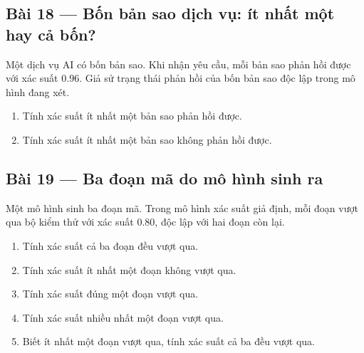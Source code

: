 \documentclass[11pt,a4paper]{article}
\begin{document}
\par\medskip

\noindent\begin{minipage}{\linewidth}
\subsection*{Bài 18 --- Bốn bản sao dịch vụ: ít nhất một hay cả bốn?}

Một dịch vụ AI có bốn bản sao. Khi nhận yêu cầu, mỗi bản sao phản hồi được với xác suất \(0.96\). Giả sử trạng thái phản hồi của bốn bản sao độc lập trong mô hình đang xét.

\begin{enumerate}[label=\alph*)]
\item Tính xác suất ít nhất một bản sao phản hồi được.
\item Tính xác suất ít nhất một bản sao không phản hồi được.
\end{enumerate}

\end{minipage}\par

\par\medskip

\noindent\begin{minipage}{\linewidth}
\subsection*{Bài 19 --- Ba đoạn mã do mô hình sinh ra}

Một mô hình sinh ba đoạn mã. Trong mô hình xác suất giả định, mỗi đoạn vượt qua bộ kiểm thử với xác suất \(0.80\), độc lập với hai đoạn còn lại.

\begin{enumerate}[label=\alph*)]
\item Tính xác suất cả ba đoạn đều vượt qua.
\item Tính xác suất ít nhất một đoạn không vượt qua.
\item Tính xác suất đúng một đoạn vượt qua.
\item Tính xác suất nhiều nhất một đoạn vượt qua.
\item Biết ít nhất một đoạn vượt qua, tính xác suất cả ba đều vượt qua.
\end{enumerate}

\end{minipage}\par
\end{document}
